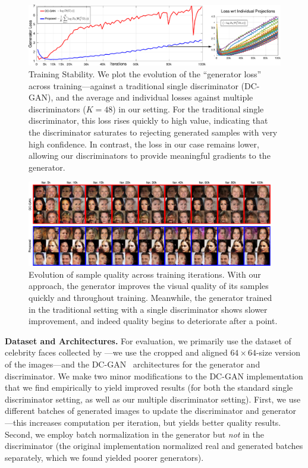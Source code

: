 \documentclass{article}
\begin{document}
\begin{figure}[!t]
  \centering
\includegraphics[width=\textwidth]{Figs/Fig2a.pdf}%
\caption{Training Stability.  We plot the evolution of the ``generator loss'' across training---against a traditional single discriminator (DC-GAN), and the average and individual losses against multiple discriminators ($K=48$) in our setting. For the traditional single discriminator, this loss rises quickly to high value, indicating that the discriminator saturates to rejecting generated samples with very high confidence. In contrast, the loss in our case remains lower, allowing our discriminators to provide meaningful gradients to the generator.}
\label{fig:trevol}
\end{figure}
\begin{figure}[!t]
  \centering
\includegraphics[width=0.96\textwidth]{Figs/Fig2b.pdf}%
\caption{Evolution of sample quality across training iterations. With our approach, the generator improves the visual quality of its samples quickly and throughout training. Meanwhile, the generator trained in the traditional setting with a single discriminator shows slower improvement, and indeed quality begins to deteriorate after a point.}%
\label{fig:trevol2}
\end{figure}

\textbf{Dataset and Architectures.} For evaluation, we primarily use the dataset of celebrity faces collected by \citet{liu2015faceattributes}---we use the cropped and aligned $64\times 64$-size version of the images---and the DC-GAN~\citep{radford2015unsupervised} architectures for the generator and discriminator. We make two minor modifications to the DC-GAN implementation that we find empirically to yield improved results (for both the standard single discriminator setting, as well as our multiple discriminator setting). First, we use different batches of generated images to update the discriminator and generator---this increases computation per iteration, but yields better quality results. Second, we employ batch normalization in the generator but \emph{not} in the discriminator (the original implementation normalized real and generated batches separately, which we found yielded poorer generators).
\end{document}
